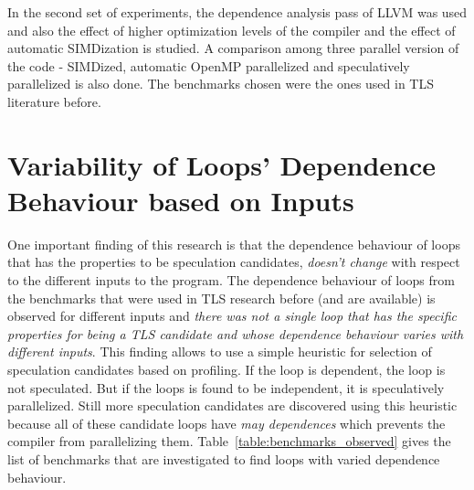 \documentclass[10pt]{report}          %
\begin{document}
In the second set of experiments, the dependence analysis pass of LLVM was used and also the effect of higher optimization levels of the compiler and the effect of automatic SIMDization is studied.  A comparison among three parallel version of the code - SIMDized, automatic OpenMP parallelized and speculatively parallelized is also done. The benchmarks chosen were the ones used in TLS literature before.

\section{Variability of Loops' Dependence Behaviour based on Inputs}

One important finding of this research is that the dependence behaviour of loops that has the properties to be speculation candidates, \textit{doesn't change} with respect to the different inputs to the program.  The dependence behaviour of loops from the benchmarks that were used in TLS research before (and are available) is observed for different inputs and \textit{there was not a single loop that has the specific properties for being a TLS candidate and whose dependence behaviour varies with different inputs}.  This finding allows to use a simple heuristic for selection of speculation candidates based on profiling.  If the loop is dependent, the loop is not speculated.  But if the loops is found to be independent, it is speculatively parallelized.  Still more speculation candidates are discovered using this heuristic because all of these candidate loops have \textit{may dependences} which prevents the compiler from parallelizing them.  Table~\ref{table:benchmarks_observed} gives the list of benchmarks that are investigated to find loops with varied dependence behaviour.\\
\end{document}
